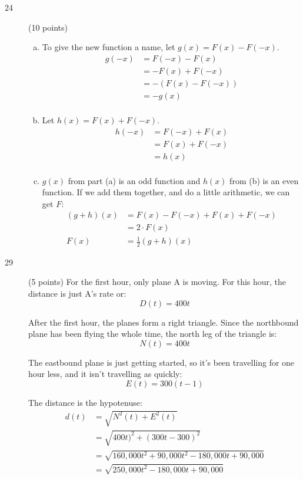 \documentclass{exam}
\begin{document}
\ifprintanswers
\begin{description}
\item[24] (10 points)

\begin{enumerate}[(a)]
\item
To give the new function a name, let $g(x) = F(x) - F(-x)$.
\begin{align*}
  g(-x) &= F(-x) - F(x) \\
        &= - F(x) + F(-x)  \\
        &= -(F(x) - F(-x)) \\
        &= -g(x) \\
\end{align*}

\item
Let $h(x) = F(x) + F(-x)$.
\begin{align*}
  h(-x) &= F(-x) + F(x) \\
        &= F(x) + F(-x) \\
        &= h(x) \\
\end{align*}

\item $g(x)$ from part (a) is an odd function and $h(x)$ from (b) is an even function.  If we add them together, and do
  a little arithmetic, we can get $F$: 
\begin{align*}
  (g + h)(x) &= F(x) - F(-x) + F(x) + F(-x) \\
             &= 2 \cdot F(x) \\
  F(x)       &= \frac{1}{2} (g + h)(x)
\end{align*}
\end{enumerate}

\item[29] (5 points)
For the first hour, only plane A is moving.  For this hour, the distance is just A's rate or:
\[
  D(t) = 400t
\]

After the first hour, the planes form a right triangle.  Since the northbound plane has been flying the whole time, the
north leg of the triangle is: 
\[
  N(t) = 400t
\]

The eastbound plane is just getting started, so it's been travelling for one hour less, and it isn't travelling as quickly:
\[
  E(t) = 300(t - 1)
\]

The distance is the hypotenuse:
\begin{align*}
  d(t) &= \sqrt{N^2(t) + E^2(t)} \\
       &= \sqrt{400t)^2 + (300t - 300)^2} \\
       &= \sqrt{160,000t^2 + 90,000t^2 - 180,000t + 90,000} \\
       &= \sqrt{250,000 t^2  - 180,000t + 90,000} \\
\end{align*}

\end{description}
\end{document}
